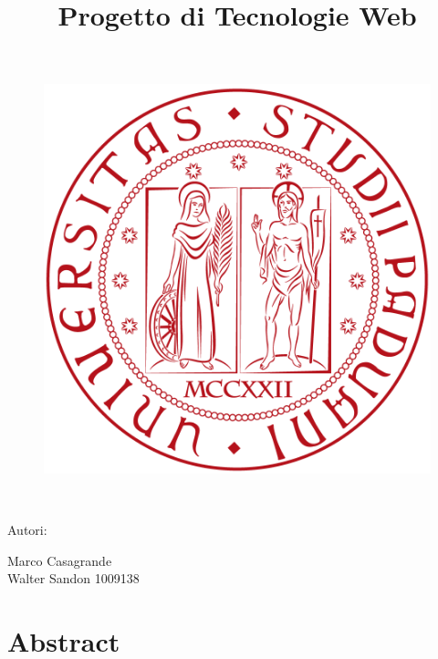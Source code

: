 \documentclass[11pt]{article}
\title{Progetto di Tecnologie Web}
\begin{document}
	\maketitle
	\begin{figure}[h]
		\centering
		\includegraphics[width=0.7\linewidth]{logo-unipd.png}
	\end{figure}
	\
	\begin{center}{\fontsize{20}{10}\selectfont Autori:}\end{center}
	\begin{center}{\fontsize{20}{30}\selectfont 
			Marco Casagrande
			\\ Walter Sandon 1009138
			
			}\end{center}
	
	\newpage
	\tableofcontents
	\newpage
	\listoffigures
	\newpage
	
	\section{Abstract}
	
\end{document}
